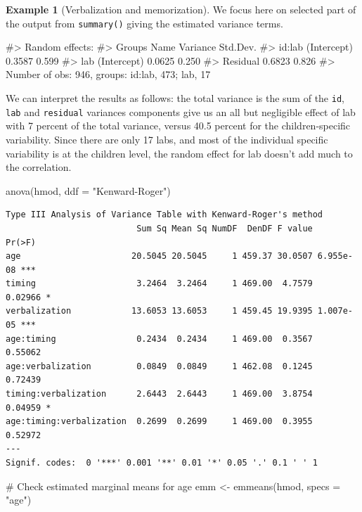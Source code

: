 \documentclass[
  11pt,
  letterpaper,
]{scrbook}
\newenvironment{Shaded}{\begin{snugshade}}{\end{snugshade}}
\newcommand{\AttributeTok}[1]{\textcolor[rgb]{0.40,0.45,0.13}{#1}}
\newcommand{\CommentTok}[1]{\textcolor[rgb]{0.37,0.37,0.37}{#1}}
\newcommand{\FunctionTok}[1]{\textcolor[rgb]{0.28,0.35,0.67}{#1}}
\newcommand{\NormalTok}[1]{\textcolor[rgb]{0.00,0.23,0.31}{#1}}
\newcommand{\OtherTok}[1]{\textcolor[rgb]{0.00,0.23,0.31}{#1}}
\newcommand{\StringTok}[1]{\textcolor[rgb]{0.13,0.47,0.30}{#1}}
\theoremstyle{definition}
\newtheorem{example}{Example}[chapter]
\theoremstyle{remark}
\begin{document}
\begin{example}[Verbalization and
memorization]
We focus here on selected part of the output from \texttt{summary()}
giving the estimated variance terms.

\begin{Shaded}
\begin{Highlighting}[]
\CommentTok{\#\textgreater{} Random effects:}
\CommentTok{\#\textgreater{}  Groups   Name        Variance Std.Dev.}
\CommentTok{\#\textgreater{}  id:lab   (Intercept) 0.3587   0.599   }
\CommentTok{\#\textgreater{}  lab      (Intercept) 0.0625   0.250   }
\CommentTok{\#\textgreater{}  Residual             0.6823   0.826   }
\CommentTok{\#\textgreater{} Number of obs: 946, groups:  id:lab, 473; lab, 17}
\end{Highlighting}
\end{Shaded}

We can interpret the results as follows: the total variance is the sum
of the \texttt{id}, \texttt{lab} and \texttt{residual} variances
components give us an all but negligible effect of lab with 7 percent of
the total variance, versus 40.5 percent for the children-specific
variability. Since there are only 17 labs, and most of the individual
specific variability is at the children level, the random effect for lab
doesn't add much to the correlation.

\begin{Shaded}
\begin{Highlighting}[]
\FunctionTok{anova}\NormalTok{(hmod, }\AttributeTok{ddf =} \StringTok{"Kenward{-}Roger"}\NormalTok{)}
\end{Highlighting}
\end{Shaded}

\begin{verbatim}
Type III Analysis of Variance Table with Kenward-Roger's method
                          Sum Sq Mean Sq NumDF  DenDF F value    Pr(>F)    
age                      20.5045 20.5045     1 459.37 30.0507 6.955e-08 ***
timing                    3.2464  3.2464     1 469.00  4.7579   0.02966 *  
verbalization            13.6053 13.6053     1 459.45 19.9395 1.007e-05 ***
age:timing                0.2434  0.2434     1 469.00  0.3567   0.55062    
age:verbalization         0.0849  0.0849     1 462.08  0.1245   0.72439    
timing:verbalization      2.6443  2.6443     1 469.00  3.8754   0.04959 *  
age:timing:verbalization  0.2699  0.2699     1 469.00  0.3955   0.52972    
---
Signif. codes:  0 '***' 0.001 '**' 0.01 '*' 0.05 '.' 0.1 ' ' 1
\end{verbatim}

\begin{Shaded}
\begin{Highlighting}[]
\CommentTok{\# Check estimated marginal means for age}
\NormalTok{emm }\OtherTok{\textless{}{-}} \FunctionTok{emmeans}\NormalTok{(hmod, }\AttributeTok{specs =} \StringTok{"age"}\NormalTok{)}
\end{Highlighting}
\end{Shaded}


\end{example}
\end{document}
